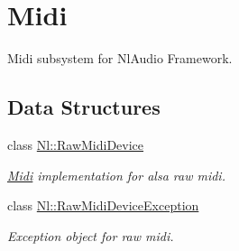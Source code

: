 \hypertarget{group__Midi}{\section{Midi}
\label{group__Midi}
}


Midi subsystem for Nl\-Audio Framework.  


\subsection*{Data Structures}
\begin{DoxyCompactItemize}
\item 
class \hyperlink{classNl_1_1RawMidiDevice}{Nl\-::\-Raw\-Midi\-Device}
\begin{DoxyCompactList}\small\item\em \hyperlink{classNl_1_1Midi}{Midi} implementation for alsa raw midi. \end{DoxyCompactList}\item 
class \hyperlink{classNl_1_1RawMidiDeviceException}{Nl\-::\-Raw\-Midi\-Device\-Exception}
\begin{DoxyCompactList}\small\item\em Exception object for raw midi. \end{DoxyCompactList}\end{DoxyCompactItemize}
